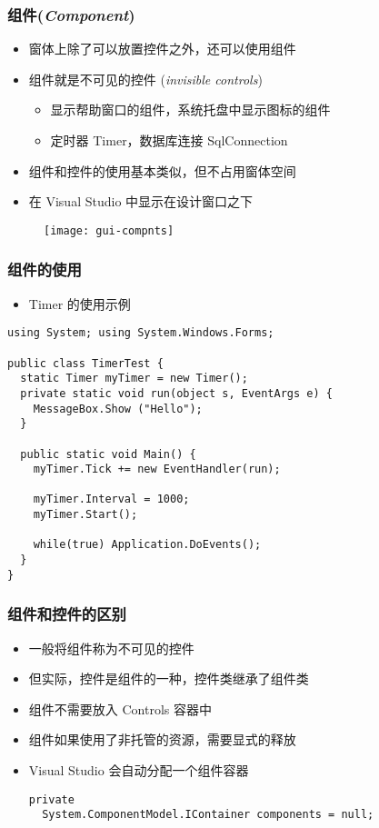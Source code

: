 \begin{frame}
\frametitle{组件(\textit{Component})}
\begin{itemize}
\item 窗体上除了可以放置控件之外，还可以使用组件
\item 组件就是不可见的控件 (\textit{invisible controls})
\begin{itemize}
\item 显示帮助窗口的组件，系统托盘中显示图标的组件
\item 定时器 Timer，数据库连接 SqlConnection
\end{itemize}
\item 组件和控件的使用基本类似，但不占用窗体空间
\item 在 Visual Studio 中显示在设计窗口之下
\end{itemize}
\begin{figure}[htbp]
  \centering
  \texttt{[image: gui-compnts]}
\end{figure}
\end{frame}

\begin{frame}[fragile]
\frametitle{组件的使用}
\begin{itemize}
\item Timer 的使用示例
\end{itemize}
\begin{lstlisting}
using System; using System.Windows.Forms;

public class TimerTest {
  static Timer myTimer = new Timer();
  private static void run(object s, EventArgs e) {
    MessageBox.Show ("Hello");
  }
 
  public static void Main() {
    myTimer.Tick += new EventHandler(run);
 
    myTimer.Interval = 1000;
    myTimer.Start();
 
    while(true) Application.DoEvents();
  }
}
\end{lstlisting}
\end{frame}

\begin{frame}[fragile]
\frametitle{组件和控件的区别}
\begin{itemize}
\setlength{\itemsep}{6pt plus 1pt}
\item 一般将组件称为不可见的控件
\item 但实际，控件是组件的一种，控件类继承了组件类
\item 组件不需要放入 Controls 容器中
\item 组件如果使用了非托管的资源，需要显式的释放
\item Visual Studio 会自动分配一个组件容器
\begin{lstlisting}
private
  System.ComponentModel.IContainer components = null;
\end{lstlisting}
\end{itemize}
\end{frame}

